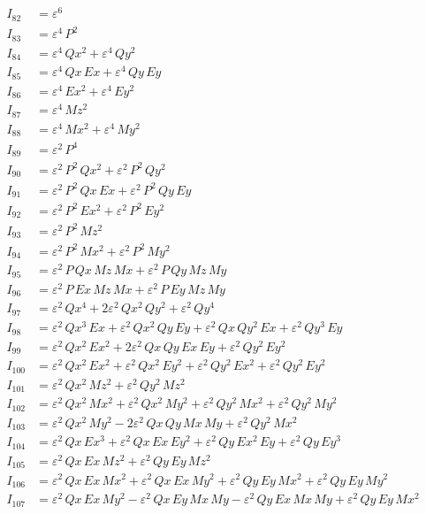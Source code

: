 \documentclass{article}
\begin{document}
\begin{align*}
I_{82} &= ε^{6} \\
I_{83} &= ε^{4}\,P^{2} \\
I_{84} &= ε^{4}\,Qx^{2} + ε^{4}\,Qy^{2} \\
I_{85} &= ε^{4}\,Qx\,Ex + ε^{4}\,Qy\,Ey \\
I_{86} &= ε^{4}\,Ex^{2} + ε^{4}\,Ey^{2} \\
I_{87} &= ε^{4}\,Mz^{2} \\
I_{88} &= ε^{4}\,Mx^{2} + ε^{4}\,My^{2} \\
I_{89} &= ε^{2}\,P^{4} \\
I_{90} &= ε^{2}\,P^{2}\,Qx^{2} + ε^{2}\,P^{2}\,Qy^{2} \\
I_{91} &= ε^{2}\,P^{2}\,Qx\,Ex + ε^{2}\,P^{2}\,Qy\,Ey \\
I_{92} &= ε^{2}\,P^{2}\,Ex^{2} + ε^{2}\,P^{2}\,Ey^{2} \\
I_{93} &= ε^{2}\,P^{2}\,Mz^{2} \\
I_{94} &= ε^{2}\,P^{2}\,Mx^{2} + ε^{2}\,P^{2}\,My^{2} \\
I_{95} &= ε^{2}\,P\,Qx\,Mz\,Mx + ε^{2}\,P\,Qy\,Mz\,My \\
I_{96} &= ε^{2}\,P\,Ex\,Mz\,Mx + ε^{2}\,P\,Ey\,Mz\,My \\
I_{97} &= ε^{2}\,Qx^{4} + 2ε^{2}\,Qx^{2}\,Qy^{2} + ε^{2}\,Qy^{4} \\
I_{98} &= ε^{2}\,Qx^{3}\,Ex + ε^{2}\,Qx^{2}\,Qy\,Ey + ε^{2}\,Qx\,Qy^{2}\,Ex + ε^{2}\,Qy^{3}\,Ey \\
I_{99} &= ε^{2}\,Qx^{2}\,Ex^{2} + 2ε^{2}\,Qx\,Qy\,Ex\,Ey + ε^{2}\,Qy^{2}\,Ey^{2} \\
I_{100} &= ε^{2}\,Qx^{2}\,Ex^{2} + ε^{2}\,Qx^{2}\,Ey^{2} + ε^{2}\,Qy^{2}\,Ex^{2} + ε^{2}\,Qy^{2}\,Ey^{2} \\
I_{101} &= ε^{2}\,Qx^{2}\,Mz^{2} + ε^{2}\,Qy^{2}\,Mz^{2} \\
I_{102} &= ε^{2}\,Qx^{2}\,Mx^{2} + ε^{2}\,Qx^{2}\,My^{2} + ε^{2}\,Qy^{2}\,Mx^{2} + ε^{2}\,Qy^{2}\,My^{2} \\
I_{103} &= ε^{2}\,Qx^{2}\,My^{2} - 2ε^{2}\,Qx\,Qy\,Mx\,My + ε^{2}\,Qy^{2}\,Mx^{2} \\
I_{104} &= ε^{2}\,Qx\,Ex^{3} + ε^{2}\,Qx\,Ex\,Ey^{2} + ε^{2}\,Qy\,Ex^{2}\,Ey + ε^{2}\,Qy\,Ey^{3} \\
I_{105} &= ε^{2}\,Qx\,Ex\,Mz^{2} + ε^{2}\,Qy\,Ey\,Mz^{2} \\
I_{106} &= ε^{2}\,Qx\,Ex\,Mx^{2} + ε^{2}\,Qx\,Ex\,My^{2} + ε^{2}\,Qy\,Ey\,Mx^{2} + ε^{2}\,Qy\,Ey\,My^{2} \\
I_{107} &= ε^{2}\,Qx\,Ex\,My^{2} -ε^{2}\,Qx\,Ey\,Mx\,My -ε^{2}\,Qy\,Ex\,Mx\,My + ε^{2}\,Qy\,Ey\,Mx^{2} \\

\end{align*}
\end{document}
